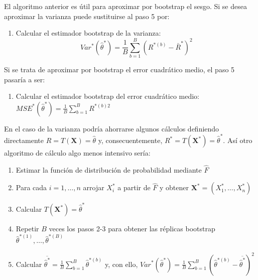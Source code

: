\documentclass[]{book}
\providecommand{\tightlist}{%
  \setlength{\itemsep}{0pt}\setlength{\parskip}{0pt}}
\theoremstyle{definition}
\theoremstyle{definition}
\theoremstyle{definition}
\theoremstyle{remark}
\begin{document}
El algoritmo anterior es útil para aproximar por bootstrap el sesgo. Si
se desea aproximar la varianza puede sustituirse al paso 5 por:

\begin{enumerate}
\def\labelenumi{\arabic{enumi}.}
\setcounter{enumi}{4}
\tightlist
\item
  Calcular el estimador bootstrap de la varianza:
  \[Var^{\ast}\left( \hat{\theta}^{\ast} \right) =\frac{1}{B}
  \sum_{b=1}^{B}\left( R^{\ast (b)}-\bar{R}^{\ast} \right)^2\]
\end{enumerate}

Si se trata de aproximar por bootstrap el error cuadrático medio, el
paso 5 pasaría a ser:

\begin{enumerate}
\def\labelenumi{\arabic{enumi}.}
\setcounter{enumi}{4}
\tightlist
\item
  Calcular el estimador bootstrap del error cuadrático medio:
  \(MSE^{\ast}\left( \hat{\theta}^{\ast} \right) =\frac{1}{B}\sum_{b=1}^{B}R^{\ast (b) 2}\)
\end{enumerate}

En el caso de la varianza podría ahorrarse algunos cálculos definiendo
directamente \(R=T\left( \mathbf{X} \right) =\hat{\theta}\) y,
consecuentemente,
\(R^{\ast}=T\left( \mathbf{X}^{\ast} \right) = \hat{\theta}^{\ast}\).
Así otro algoritmo de cálculo algo menos intensivo sería:

\begin{enumerate}
\def\labelenumi{\arabic{enumi}.}
\item
  Estimar la función de distribución de probabilidad mediante
  \(\hat{ F}\)
\item
  Para cada \(i=1,\ldots ,n\) arrojar \(X_i^{\ast}\) a partir de
  \(\hat{F}\) y obtener
  \(\mathbf{X}^{\ast}=\left( X_1^{\ast}, \ldots, X_n^{\ast} \right)\)
\item
  Calcular \(T\left( \mathbf{X}^{\ast} \right) = \hat{\theta}^{\ast}\)
\item
  Repetir \(B\) veces los pasos 2-3 para obtener las réplicas bootstrap
  \(\hat{\theta}^{\ast (1)}, \ldots, \hat{\theta}^{\ast(B)}\)
\item
  Calcular
  \(\overline{\hat{\theta}^{\ast}}=\frac{1}{B}\sum_{b=1}^{B}\hat{ \theta}^{\ast (b)}\)
  y, con ello,
  \(Var^{\ast}\left( \hat{\theta}^{\ast} \right) =\frac{1}{B}\sum_{b=1}^{B}\left( \hat{\theta}^{\ast \left(b \right)}-\overline{\hat{\theta}^{\ast}} \right)^2\)
\end{enumerate}
\end{document}

